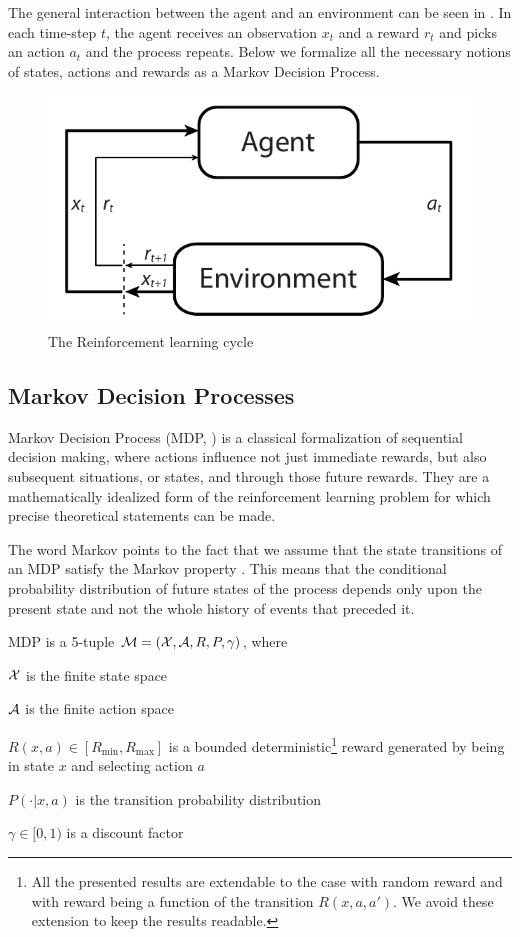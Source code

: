 The general interaction between the agent and an environment can be seen in . In each time-step $t$, the agent receives an observation $x_t$ and a reward $r_t$ and picks an action $a_t$ and the process repeats. Below we formalize all the necessary notions of states, actions and rewards as a Markov Decision Process.

\begin{figure}[h]
\center
\includegraphics[width=.6\linewidth]{gfx/rl_loop.pdf}
\caption{The Reinforcement learning cycle}
\label{fig:rlloop}
\end{figure}

\subsection{Markov Decision Processes}

Markov Decision Process (MDP, \citet{bellman1957markovian}) is a classical formalization of sequential decision making, where actions influence not just immediate rewards, but also subsequent situations, or states, and through those future rewards. They are a mathematically idealized form of the reinforcement learning problem for which precise theoretical statements can be made.

The word Markov points to the fact that we assume that the state transitions of an MDP satisfy the Markov property \cite{???}. This means that the conditional probability distribution of future states of the process depends only upon the present state and not the whole history of events that preceded it.

\begin{definition}

MDP is a 5-tuple $\mathcal{M} = (\mathcal{X}, \mathcal{A}, R, P, \gamma)$, where 

$\mathcal{X}$ is the finite state space

$\mathcal{A}$ is the finite action space

$R(x, a) \in [R_{\min}, R_{\max}]$ is a bounded deterministic\footnote{All the presented results are extendable to the case with random reward and with reward being a function of the transition $R(x, a, a')$. We avoid these extension to keep the results readable.} reward generated by being in state $x$ and selecting action $a$

$P(\cdot|x, a)$ is the transition probability distribution

$\gamma \in [0, 1)$ is a discount factor
\end{definition}

